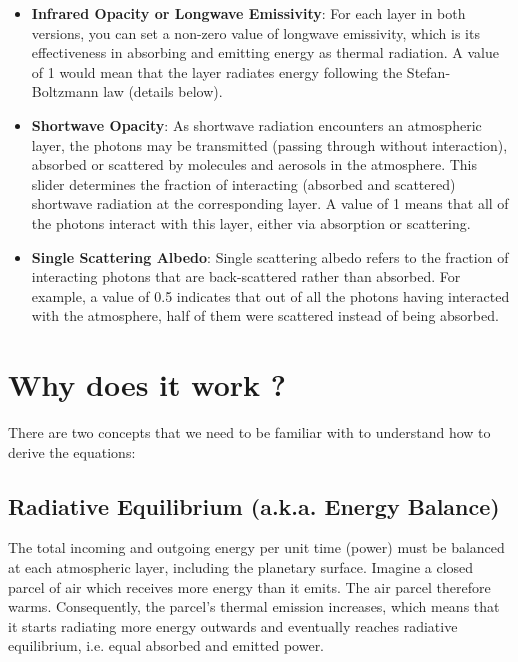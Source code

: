 \documentclass[a4paper,12pt]{article}
\begin{document}
\begin{itemize}
    \item \textbf{Infrared Opacity or Longwave Emissivity}: For each layer in both versions, you can set a non-zero value of longwave emissivity, which is its effectiveness in absorbing and emitting energy as thermal radiation. A value of 1 would mean that the layer radiates energy following the Stefan-Boltzmann law (details below).
    
    \item \textbf{Shortwave Opacity}: As shortwave radiation encounters an atmospheric layer, the photons may be transmitted (passing through without interaction), absorbed or scattered by molecules and aerosols in the atmosphere. This slider determines the fraction of interacting (absorbed and scattered) shortwave radiation at the corresponding layer. A value of 1 means that all of the photons interact with this layer, either via absorption or scattering.
    
    \item \textbf{Single Scattering Albedo}: Single scattering albedo refers to the fraction of interacting photons that are back-scattered rather than absorbed. For example, a value of 0.5 indicates that out of all the photons having interacted with the atmosphere, half of them were scattered instead of being absorbed.
    
\end{itemize}



\section*{Why does it work ?}

There are two concepts that we need to be familiar with to understand how to derive the equations:

\subsection*{Radiative Equilibrium (a.k.a. Energy Balance)}

The total incoming and outgoing energy per unit time (power) must be balanced at each atmospheric layer, including the planetary surface. Imagine a closed parcel of air which receives more energy than it emits. The air parcel therefore warms. Consequently, the parcel's thermal emission increases, which means that it starts radiating more energy outwards and eventually reaches radiative equilibrium, i.e. equal absorbed and emitted power.
\end{document}
